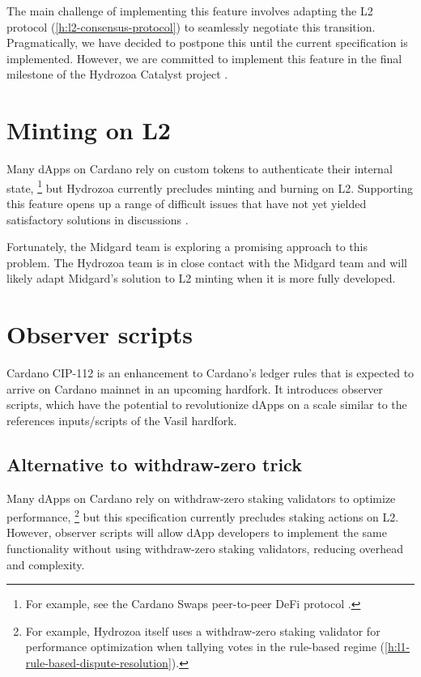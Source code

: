 \documentclass[../hydrozoa.tex]{subfiles}
\begin{document}
The main challenge of implementing this feature involves adapting the L2 protocol (\cref{h:l2-consensus-protocol}) to seamlessly negotiate this transition.
Pragmatically, we have decided to postpone this until the current specification is implemented.
However, we are committed to implement this feature in the final milestone of the Hydrozoa Catalyst project \citep{FlerovskyCatalystMilestonesHydrozoa2024}.

\section{Minting on L2}%
\label{h:future-work-minting}%

Many dApps on Cardano rely on custom tokens to authenticate their internal state,%
\footnote{For example, see the Cardano Swaps peer-to-peer DeFi protocol \citep{fallen-icarusCardanoSwapsP2P2025}.}
  but Hydrozoa currently precludes minting and burning on L2.
Supporting this feature opens up a range of difficult issues that have not yet yielded satisfactory solutions in discussions \citep{IOGExcludePhantomTokens2025}.

Fortunately, the Midgard team is exploring a promising approach to this problem.
The Hydrozoa team is in close contact with the Midgard team and will likely adapt Midgard's solution to L2 minting when it is more fully developed.

\section{Observer scripts}%
\label{h:future-work-observer-scripts}%

Cardano CIP-112 \citep{DiSarroCIP112ObserveScript2024} is an enhancement to Cardano's ledger rules that is expected to arrive on Cardano mainnet in an upcoming hardfork.
It introduces observer scripts, which have the potential to revolutionize dApps on a scale similar to the references inputs/scripts of the Vasil hardfork.

\subsection{Alternative to withdraw-zero trick}%
\label{h:observer-script-withdraw-zero-trick}%

Many dApps on Cardano rely on withdraw-zero staking validators to optimize performance,%
\footnote{For example, Hydrozoa itself uses a withdraw-zero staking validator for performance optimization when tallying votes in the rule-based regime (\cref{h:l1-rule-based-dispute-resolution}).}
but this specification currently precludes staking actions on L2.
However, observer scripts will allow dApp developers to implement the same functionality without using withdraw-zero staking validators, reducing overhead and complexity.
\end{document}
